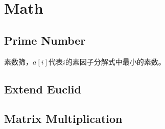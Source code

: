 \section{Math}
	\subsection{Prime Number}
		\begin{flushleft}
			素数筛，$a[i]$代表$i$的素因子分解式中最小的素数。
		\end{flushleft}
		
	\subsection{Extend Euclid}
		
	\subsection{Matrix Multiplication}
		